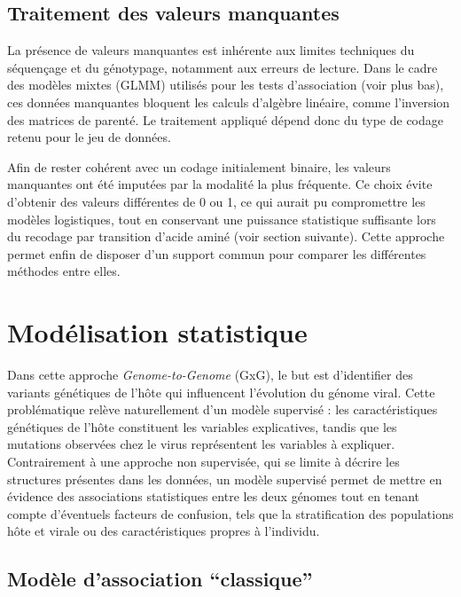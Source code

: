 \documentclass[11pt,a4paper]{article}
\begin{document}
\vspace{1cm}

\subsection{Traitement des valeurs manquantes}

La présence de valeurs manquantes est inhérente aux limites techniques du séquençage et du génotypage, notamment aux erreurs de lecture. Dans le cadre des modèles mixtes (GLMM) utilisés pour les tests d'association (voir plus bas), ces données manquantes bloquent les calculs d'algèbre linéaire, comme l'inversion des matrices de parenté. Le traitement appliqué dépend donc du type de codage retenu pour le jeu de données.

Afin de rester cohérent avec un codage initialement binaire, les valeurs manquantes ont été imputées par la modalité la plus fréquente. Ce choix évite d'obtenir des valeurs différentes de 0 ou 1, ce qui aurait pu compromettre les modèles logistiques, tout en conservant une puissance statistique suffisante lors du recodage par transition d'acide aminé (voir section suivante). Cette approche permet enfin de disposer d'un support commun pour comparer les différentes méthodes entre elles.

\newpage
\section{Modélisation statistique}
\vspace{1.5cm}

Dans cette approche \textit{Genome-to-Genome} (GxG), le but est d'identifier des variants génétiques de l'hôte qui influencent l'évolution du génome viral.
Cette problématique relève naturellement d'un modèle supervisé : les caractéristiques génétiques de l'hôte constituent les variables explicatives,
tandis que les mutations observées chez le virus représentent les variables à expliquer.
Contrairement à une approche non supervisée, qui se limite à décrire les structures présentes dans les données,
un modèle supervisé permet de mettre en évidence des associations statistiques entre les deux génomes tout en tenant compte d'éventuels facteurs de confusion,
tels que la stratification des populations hôte et virale ou des caractéristiques propres à l'individu.


\subsection{Modèle d'association ``classique''}
\end{document}
